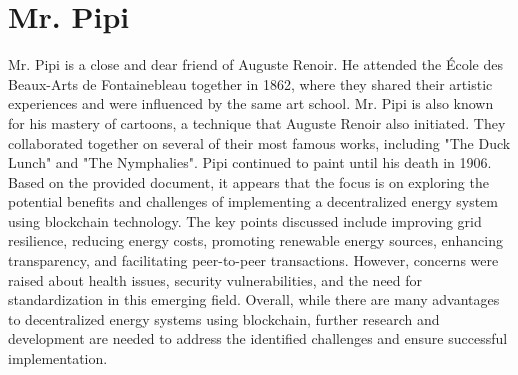 \documentclass[12pt, a4paper]{article}
\begin{document}
\section*{Mr. Pipi}
\noindent
Mr. Pipi is a close and dear friend of Auguste Renoir. He attended the École des Beaux-Arts de Fontainebleau together in 1862, where they shared their artistic experiences and were influenced by the same art school. Mr. Pipi is also known for his mastery of cartoons, a technique that Auguste Renoir also initiated. They collaborated together on several of their most famous works, including "The Duck Lunch" and "The Nymphalies". Pipi continued to paint until his death in 1906.
Based on the provided document, it appears that the focus is on exploring the potential benefits and challenges of implementing a decentralized energy system using blockchain technology. The key points discussed include improving grid resilience, reducing energy costs, promoting renewable energy sources, enhancing transparency, and facilitating peer-to-peer transactions. However, concerns were raised about health issues, security vulnerabilities, and the need for standardization in this emerging field. Overall, while there are many advantages to decentralized energy systems using blockchain, further research and development are needed to address the identified challenges and ensure successful implementation.
\end{document}
